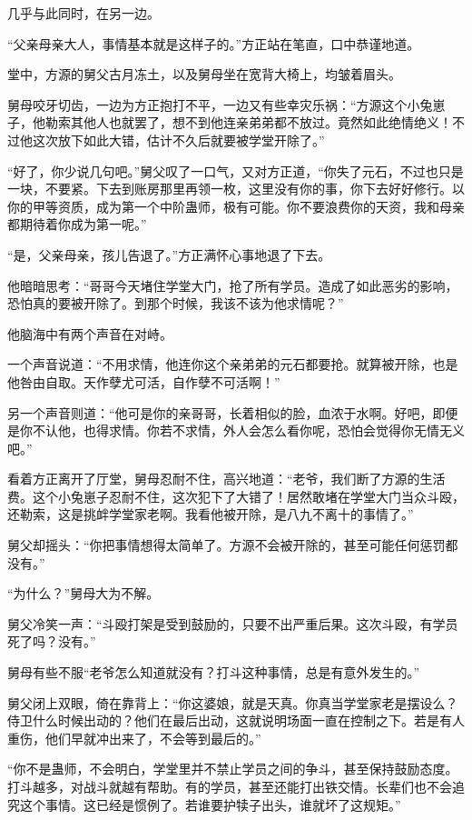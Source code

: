 
\begin{this_body}

几乎与此同时，在另一边。

“父亲母亲大人，事情基本就是这样子的。”方正站在笔直，口中恭谨地道。

堂中，方源的舅父古月冻土，以及舅母坐在宽背大椅上，均皱着眉头。

舅母咬牙切齿，一边为方正抱打不平，一边又有些幸灾乐祸：“方源这个小兔崽子，他勒索其他人也就罢了，想不到他连亲弟弟都不放过。竟然如此绝情绝义！不过他这次放下如此大错，估计不久后就要被学堂开除了。”

“好了，你少说几句吧。”舅父叹了一口气，又对方正道，“你失了元石，不过也只是一块，不要紧。下去到账房那里再领一枚，这里没有你的事，你下去好好修行。以你的甲等资质，成为第一个中阶蛊师，极有可能。你不要浪费你的天资，我和母亲都期待着你成为第一呢。”

“是，父亲母亲，孩儿告退了。”方正满怀心事地退了下去。

他暗暗思考：“哥哥今天堵住学堂大门，抢了所有学员。造成了如此恶劣的影响，恐怕真的要被开除了。到那个时候，我该不该为他求情呢？”

他脑海中有两个声音在对峙。

一个声音说道：“不用求情，他连你这个亲弟弟的元石都要抢。就算被开除，也是他咎由自取。天作孽尤可活，自作孽不可活啊！”

另一个声音则道：“他可是你的亲哥哥，长着相似的脸，血浓于水啊。好吧，即便是你不认他，也得求情。你若不求情，外人会怎么看你呢，恐怕会觉得你无情无义吧。”

看着方正离开了厅堂，舅母忍耐不住，高兴地道：“老爷，我们断了方源的生活费。这个小兔崽子忍耐不住，这次犯下了大错了！居然敢堵在学堂大门当众斗殴，还勒索，这是挑衅学堂家老啊。我看他被开除，是八九不离十的事情了。”

舅父却摇头：“你把事情想得太简单了。方源不会被开除的，甚至可能任何惩罚都没有。”

“为什么？”舅母大为不解。

舅父冷笑一声：“斗殴打架是受到鼓励的，只要不出严重后果。这次斗殴，有学员死了吗？没有。”

舅母有些不服“老爷怎么知道就没有？打斗这种事情，总是有意外发生的。”

舅父闭上双眼，倚在靠背上：“你这婆娘，就是天真。你真当学堂家老是摆设么？侍卫什么时候出动的？他们在最后出动，这就说明场面一直在控制之下。若是有人重伤，他们早就冲出来了，不会等到最后的。”

“你不是蛊师，不会明白，学堂里并不禁止学员之间的争斗，甚至保持鼓励态度。打斗越多，对战斗就越有帮助。有的学员，甚至还能打出铁交情。长辈们也不会追究这个事情。这已经是惯例了。若谁要护犊子出头，谁就坏了这规矩。”


\end{this_body}
